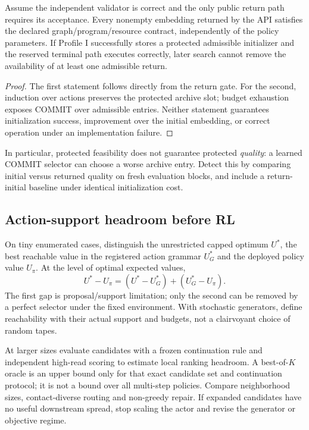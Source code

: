 \begin{proposition}
Assume the independent validator is correct and the only public return path requires its acceptance. Every nonempty embedding returned by the API satisfies the declared graph/program/resource contract, independently of the policy parameters. If Profile I successfully stores a protected admissible initializer and the reserved terminal path executes correctly, later search cannot remove the availability of at least one admissible return.
\end{proposition}
\begin{proof}
The first statement follows directly from the return gate. For the second, induction over actions preserves the protected archive slot; budget exhaustion exposes COMMIT over admissible entries. Neither statement guarantees initialization success, improvement over the initial embedding, or correct operation under an implementation failure.
\end{proof}

In particular, protected feasibility does not guarantee protected \emph{quality}: a learned COMMIT selector can choose a worse archive entry. Detect this by comparing initial versus returned quality on fresh evaluation blocks, and include a return-initial baseline under identical initialization cost.

\subsection{Action-support headroom before RL}
On tiny enumerated cases, distinguish the unrestricted capped optimum $U^*$, the best reachable value in the registered action grammar $U_G^*$ and the deployed policy value $U_\pi$. At the level of optimal expected values,
\begin{equation}
U^*-U_\pi=(U^*-U_G^*)+(U_G^*-U_\pi).
\end{equation}
The first gap is proposal/support limitation; only the second can be removed by a perfect selector under the fixed environment. With stochastic generators, define reachability with their actual support and budgets, not a clairvoyant choice of random tapes.

At larger sizes evaluate candidates with a frozen continuation rule and independent high-read scoring to estimate local ranking headroom. A best-of-$K$ oracle is an upper bound only for that exact candidate set and continuation protocol; it is not a bound over all multi-step policies. Compare neighborhood sizes, contact-diverse routing and non-greedy repair. If expanded candidates have no useful downstream spread, stop scaling the actor and revise the generator or objective regime.


